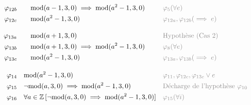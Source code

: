 \documentclass{article}
\begin{document}
\begin{align*}
\varphi_{12b} \quad & \quad \text{mod}(a - 1, 3, 0) \implies \text{mod}(a^2 - 1, 3, 0) && \textcolor{Gray}{\varphi_5(\forall e)} \\
\varphi_{12c} \quad & \quad \text{mod}(a^2 - 1, 3, 0) && \textcolor{Gray}{\varphi_{12a}, \varphi_{12b} (\implies e)} \\[1em] %
\varphi_{13a} \quad & \quad \text{mod}(a + 1, 3, 0) && \textcolor{Gray}{\text{Hypothèse (Cas 2)}} \\
\varphi_{13b} \quad & \quad \text{mod}(a + 1, 3, 0) \implies \text{mod}(a^2 - 1, 3, 0) && \textcolor{Gray}{\varphi_8(\forall e)} \\
\varphi_{13c} \quad & \quad \text{mod}(a^2 - 1, 3, 0) && \textcolor{Gray}{\varphi_{13a}, \varphi_{13b} (\implies e)} \\[1em] %
\varphi_{14} \quad & \text{mod}(a^2 - 1, 3, 0) && \textcolor{Gray}{\varphi_{11}, \varphi_{12c}, \varphi_{13c}  \lor e} \\
\varphi_{15} \quad & \neg\text{mod}(a, 3, 0) \implies \text{mod}(a^2 - 1, 3, 0) && \textcolor{Gray}{\text{Décharge de l'hypothèse } \varphi_{10}} \\
\varphi_{16} \quad & \forall a \in \mathbb{Z} \, [\neg\text{mod}(a, 3, 0) \implies \text{mod}(a^2 - 1, 3, 0)] && \textcolor{Gray}{\varphi_{15}(\forall i)}
\end{align*}
\end{document}
